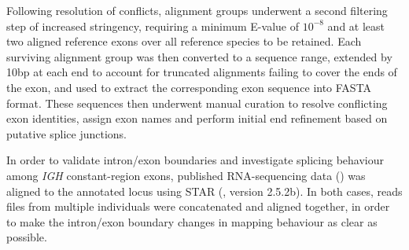 Following resolution of conflicts, alignment groups underwent a second filtering step of increased stringency, requiring a minimum E-value of $10^{-8}$ and at least two aligned reference exons over all reference species to be retained. Each surviving alignment group was then converted to a sequence range, extended by 10bp at each end to account for truncated alignments failing to cover the ends of the exon, and used to extract the corresponding exon sequence into FASTA format. These sequences then underwent manual curation to resolve conflicting exon identities, assign exon names and perform initial end refinement based on putative splice junctions.

In order to validate intron/exon boundaries and investigate splicing behaviour among \textit{IGH} constant-region exons, published RNA-sequencing data () was aligned to the annotated locus using STAR (\parencite{dobin2013star}, version 2.5.2b). In both cases, reads files from multiple individuals were concatenated and aligned together, in order to make the intron/exon boundary changes in mapping behaviour as clear as possible. %

